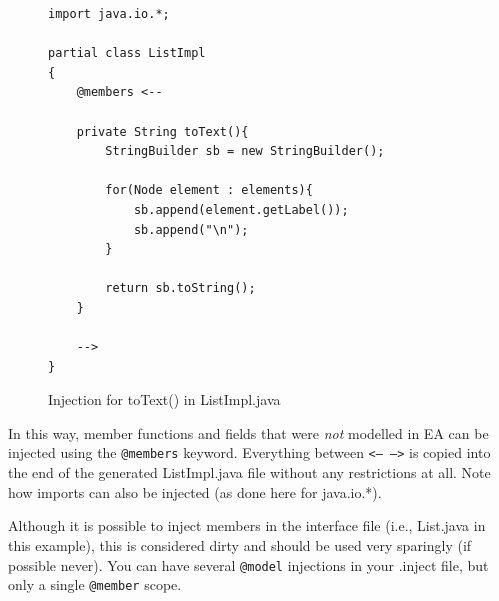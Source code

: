 \begin{figure}[htbp]
\centering
\begin{lstlisting}[language=Injection]
import java.io.*;

partial class ListImpl
{
    @members <--

    private String toText(){
        StringBuilder sb = new StringBuilder();

        for(Node element : elements){
            sb.append(element.getLabel());
            sb.append("\n");
        }

        return sb.toString();
    }

    -->
}
\end{lstlisting}
\caption{Injection for \textsf{toText()} in \textsf{ListImpl.java}}
\label{code:listImpl_toText_impl}
\end{figure}

In this way, member functions and fields that were \emph{not} modelled in EA can be injected using the \texttt{@members} keyword. 
Everything between \texttt{<--  -->} is copied into the end of the generated \textsf{ListImpl.java} file without any restrictions at all.
Note how imports can also be injected (as done here for \textsf{java.io.*}). 

Although it is possible to inject members in the interface file (i.e., \textsf{List.java} in this example), this is considered dirty and should be used very sparingly (if possible never). 
You can have several \texttt{@model} injections in your \textsf{.inject} file, but only a single \texttt{@member} scope.